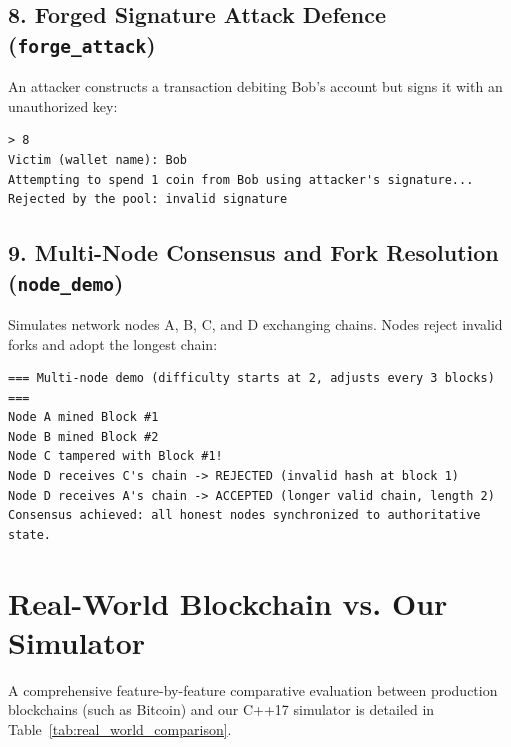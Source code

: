 \documentclass[11pt,a4paper]{report}
\begin{document}
\subsection*{8. Forged Signature Attack Defence (\texttt{forge\_attack})}
An attacker constructs a transaction debiting Bob's account but signs it with an unauthorized key:
\begin{lstlisting}
> 8
Victim (wallet name): Bob
Attempting to spend 1 coin from Bob using attacker's signature...
Rejected by the pool: invalid signature
\end{lstlisting}

\subsection*{9. Multi-Node Consensus and Fork Resolution (\texttt{node\_demo})}
Simulates network nodes A, B, C, and D exchanging chains. Nodes reject invalid forks and adopt the longest chain:
\begin{lstlisting}
=== Multi-node demo (difficulty starts at 2, adjusts every 3 blocks) ===
Node A mined Block #1
Node B mined Block #2
Node C tampered with Block #1!
Node D receives C's chain -> REJECTED (invalid hash at block 1)
Node D receives A's chain -> ACCEPTED (longer valid chain, length 2)
Consensus achieved: all honest nodes synchronized to authoritative state.
\end{lstlisting}

\clearpage

\section{Real-World Blockchain vs. Our Simulator}

A comprehensive feature-by-feature comparative evaluation between production blockchains (such as Bitcoin) and our C++17 simulator is detailed in Table~\ref{tab:real_world_comparison}.
\end{document}
